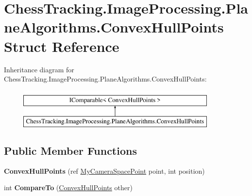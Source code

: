 \hypertarget{struct_chess_tracking_1_1_image_processing_1_1_plane_algorithms_1_1_convex_hull_points}{}\section{Chess\+Tracking.\+Image\+Processing.\+Plane\+Algorithms.\+Convex\+Hull\+Points Struct Reference}
\label{struct_chess_tracking_1_1_image_processing_1_1_plane_algorithms_1_1_convex_hull_points}
Inheritance diagram for Chess\+Tracking.\+Image\+Processing.\+Plane\+Algorithms.\+Convex\+Hull\+Points\+:\begin{figure}[H]
\begin{center}
\leavevmode
\includegraphics[height=2.000000cm]{struct_chess_tracking_1_1_image_processing_1_1_plane_algorithms_1_1_convex_hull_points}
\end{center}
\end{figure}
\subsection*{Public Member Functions}
\begin{DoxyCompactItemize}
\item 
\mbox{\label{struct_chess_tracking_1_1_image_processing_1_1_plane_algorithms_1_1_convex_hull_points_a2b4a4250f0dce0986961e759c80db9af}} 
{\bfseries Convex\+Hull\+Points} (ref \mbox{\hyperlink{struct_chess_tracking_1_1_image_processing_1_1_plane_algorithms_1_1_my_camera_space_point}{My\+Camera\+Space\+Point}} point, int position)
\item 
\mbox{\label{struct_chess_tracking_1_1_image_processing_1_1_plane_algorithms_1_1_convex_hull_points_a00d5a2f61549285dd1300346e30e047f}} 
int {\bfseries Compare\+To} (\mbox{\hyperlink{struct_chess_tracking_1_1_image_processing_1_1_plane_algorithms_1_1_convex_hull_points}{Convex\+Hull\+Points}} other)
\end{DoxyCompactItemize}
